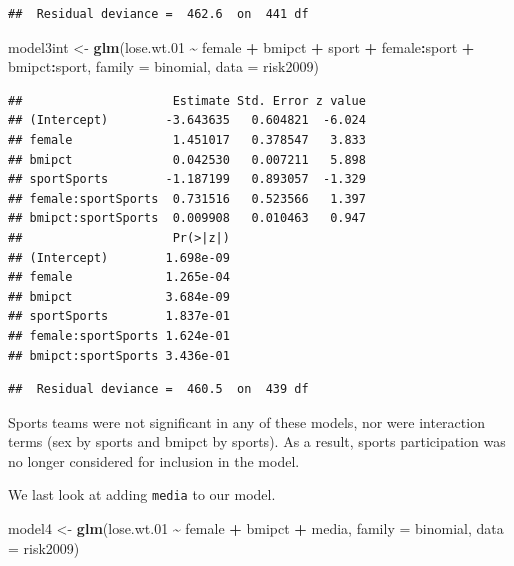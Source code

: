\documentclass[
]{krantz}
\newenvironment{Shaded}{\begin{snugshade}}{\end{snugshade}}
\newcommand{\AttributeTok}[1]{\textcolor[rgb]{0.27,0.27,0.27}{#1}}
\newcommand{\FloatTok}[1]{\textcolor[rgb]{0.06,0.06,0.06}{#1}}
\newcommand{\FunctionTok}[1]{\textcolor[rgb]{0.27,0.27,0.27}{\textbf{#1}}}
\newcommand{\NormalTok}[1]{#1}
\newcommand{\OtherTok}[1]{\textcolor[rgb]{0.37,0.37,0.37}{#1}}
\newcommand{\SpecialCharTok}[1]{\textcolor[rgb]{0.43,0.43,0.43}{\textbf{#1}}}
\begin{document}
\begin{verbatim}
##  Residual deviance =  462.6  on  441 df
\end{verbatim}

\begin{Shaded}
\begin{Highlighting}[]
\NormalTok{model3int }\OtherTok{\textless{}{-}} \FunctionTok{glm}\NormalTok{(lose.wt}\FloatTok{.01} \SpecialCharTok{\textasciitilde{}}\NormalTok{ female }\SpecialCharTok{+}\NormalTok{ bmipct }\SpecialCharTok{+}\NormalTok{ sport }\SpecialCharTok{+}
\NormalTok{              female}\SpecialCharTok{:}\NormalTok{sport }\SpecialCharTok{+}\NormalTok{ bmipct}\SpecialCharTok{:}\NormalTok{sport, }
              \AttributeTok{family =}\NormalTok{ binomial, }\AttributeTok{data =}\NormalTok{ risk2009)}
\end{Highlighting}
\end{Shaded}

\begin{verbatim}
##                     Estimate Std. Error z value
## (Intercept)        -3.643635   0.604821  -6.024
## female              1.451017   0.378547   3.833
## bmipct              0.042530   0.007211   5.898
## sportSports        -1.187199   0.893057  -1.329
## female:sportSports  0.731516   0.523566   1.397
## bmipct:sportSports  0.009908   0.010463   0.947
##                     Pr(>|z|)
## (Intercept)        1.698e-09
## female             1.265e-04
## bmipct             3.684e-09
## sportSports        1.837e-01
## female:sportSports 1.624e-01
## bmipct:sportSports 3.436e-01
\end{verbatim}

\begin{verbatim}
##  Residual deviance =  460.5  on  439 df
\end{verbatim}

Sports teams were not significant in any of these models, nor were interaction terms (sex by sports and bmipct by sports). As a result, sports participation was no longer considered for inclusion in the model.

We last look at adding \texttt{media} to our model.

\begin{Shaded}
\begin{Highlighting}[]
\NormalTok{model4 }\OtherTok{\textless{}{-}} \FunctionTok{glm}\NormalTok{(lose.wt}\FloatTok{.01} \SpecialCharTok{\textasciitilde{}}\NormalTok{ female }\SpecialCharTok{+}\NormalTok{ bmipct }\SpecialCharTok{+}\NormalTok{ media, }
              \AttributeTok{family =}\NormalTok{ binomial, }\AttributeTok{data =}\NormalTok{ risk2009)}
\end{Highlighting}
\end{Shaded}
\end{document}
